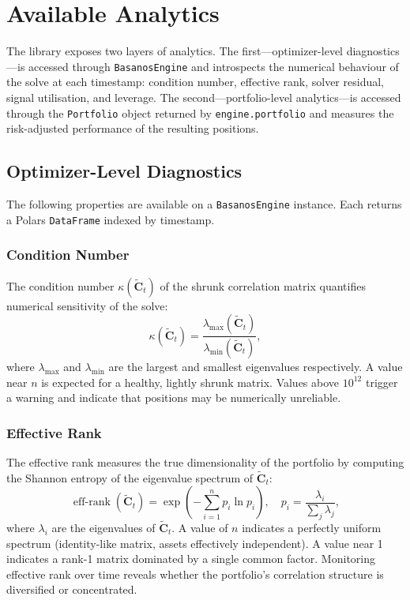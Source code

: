 \documentclass[11pt,a4paper]{article}
\newcommand{\C}{\mathbf{C}}
\DeclareMathOperator{\eff}{eff\text{-}rank}
\begin{document}
\section{Available Analytics}
\label{sec:analytics}

The library exposes two layers of analytics.  The first---optimizer-level
diagnostics---is accessed through \texttt{BasanosEngine} and introspects the
numerical behaviour of the solve at each timestamp: condition number, effective
rank, solver residual, signal utilisation, and leverage.  The second---portfolio-level
analytics---is accessed through the \texttt{Portfolio} object returned by
\texttt{engine.portfolio} and measures the risk-adjusted performance of the
resulting positions.

\subsection{Optimizer-Level Diagnostics}
\label{sec:diagnostics}

The following properties are available on a \texttt{BasanosEngine} instance.
Each returns a Polars \texttt{DataFrame} indexed by timestamp.

\subsubsection{Condition Number}

The condition number $\kappa(\tilde{\C}_t)$ of the shrunk correlation matrix
quantifies numerical sensitivity of the solve:
\begin{equation}
  \kappa(\tilde{\C}_t) = \frac{\lambda_{\max}(\tilde{\C}_t)}
                              {\lambda_{\min}(\tilde{\C}_t)},
\end{equation}
where $\lambda_{\max}$ and $\lambda_{\min}$ are the largest and smallest
eigenvalues respectively.  A value near $n$ is expected for a healthy,
lightly shrunk matrix.  Values above $10^{12}$ trigger a warning and indicate
that positions may be numerically unreliable.

\subsubsection{Effective Rank}

The effective rank measures the true dimensionality of the portfolio by
computing the Shannon entropy of the eigenvalue spectrum of $\tilde{\C}_t$:
\begin{equation}
  \eff(\tilde{\C}_t) = \exp\!\left(-\sum_{i=1}^{n} p_i \ln p_i\right),
  \quad p_i = \frac{\lambda_i}{\sum_j \lambda_j},
\end{equation}
where $\lambda_i$ are the eigenvalues of $\tilde{\C}_t$.  A value of $n$
indicates a perfectly uniform spectrum (identity-like matrix, assets
effectively independent).  A value near 1 indicates a rank-1 matrix dominated
by a single common factor.  Monitoring effective rank over time reveals whether
the portfolio's correlation structure is diversified or concentrated.
\end{document}
